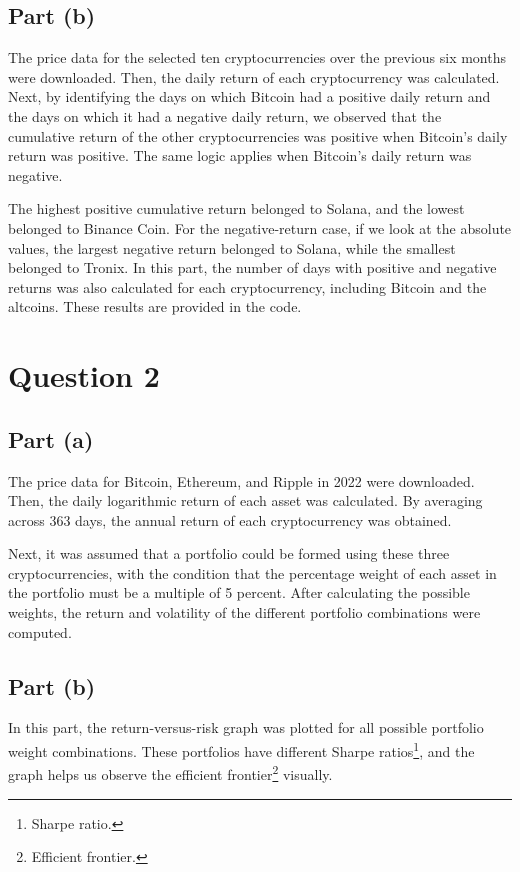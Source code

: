\documentclass[12pt,a4paper]{article}
\begin{document}
\subsection*{Part (b)}
The price data for the selected ten cryptocurrencies over the previous six months were downloaded. Then, the daily return of each cryptocurrency was calculated. Next, by identifying the days on which Bitcoin had a positive daily return and the days on which it had a negative daily return, we observed that the cumulative return of the other cryptocurrencies was positive when Bitcoin's daily return was positive. The same logic applies when Bitcoin's daily return was negative.

The highest positive cumulative return belonged to Solana, and the lowest belonged to Binance Coin. For the negative-return case, if we look at the absolute values, the largest negative return belonged to Solana, while the smallest belonged to Tronix. In this part, the number of days with positive and negative returns was also calculated for each cryptocurrency, including Bitcoin and the altcoins. These results are provided in the code.

\section*{Question 2}

\subsection*{Part (a)}
The price data for Bitcoin, Ethereum, and Ripple in 2022 were downloaded. Then, the daily logarithmic return of each asset was calculated. By averaging across 363 days, the annual return of each cryptocurrency was obtained.

Next, it was assumed that a portfolio could be formed using these three cryptocurrencies, with the condition that the percentage weight of each asset in the portfolio must be a multiple of 5 percent. After calculating the possible weights, the return and volatility of the different portfolio combinations were computed.

\subsection*{Part (b)}
In this part, the return-versus-risk graph was plotted for all possible portfolio weight combinations. These portfolios have different Sharpe ratios\footnote{Sharpe ratio.}, and the graph helps us observe the efficient frontier\footnote{Efficient frontier.} visually.
\end{document}
